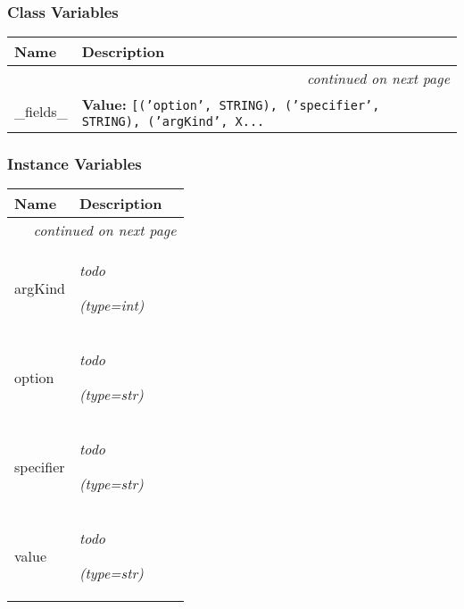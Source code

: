 
  \subsubsection{Class Variables}

    \vspace{-1cm}
\hspace{\varindent}\begin{longtable}{|p{\varnamewidth}|p{\vardescrwidth}|l}
\cline{1-2}
\cline{1-2} \centering \textbf{Name} & \centering \textbf{Description}& \\
\cline{1-2}
\endhead\cline{1-2}\multicolumn{3}{r}{\small\textit{continued on next page}}\\\endfoot\cline{1-2}
\endlastfoot\raggedright \_\-f\-i\-e\-l\-d\-s\-\_\- & \raggedright \textbf{Value:} 
{\tt [('option', STRING), ('specifier', STRING), ('argKind', X\texttt{...}}&\\
\cline{1-2}
\end{longtable}



  \subsubsection{Instance Variables}

    \vspace{-1cm}
\hspace{\varindent}\begin{longtable}{|p{\varnamewidth}|p{\vardescrwidth}|l}
\cline{1-2}
\cline{1-2} \centering \textbf{Name} & \centering \textbf{Description}& \\
\cline{1-2}
\endhead\cline{1-2}\multicolumn{3}{r}{\small\textit{continued on next page}}\\\endfoot\cline{1-2}
\endlastfoot\raggedright a\-r\-g\-K\-i\-n\-d\- & \raggedright \emph{todo}

            {\it (type=int)}&\\
\cline{1-2}
\raggedright o\-p\-t\-i\-o\-n\- & \raggedright \emph{todo}

            {\it (type=str)}&\\
\cline{1-2}
\raggedright s\-p\-e\-c\-i\-f\-i\-e\-r\- & \raggedright \emph{todo}

            {\it (type=str)}&\\
\cline{1-2}
\raggedright v\-a\-l\-u\-e\- & \raggedright \emph{todo}

            {\it (type=str)}&\\
\cline{1-2}
\end{longtable}

